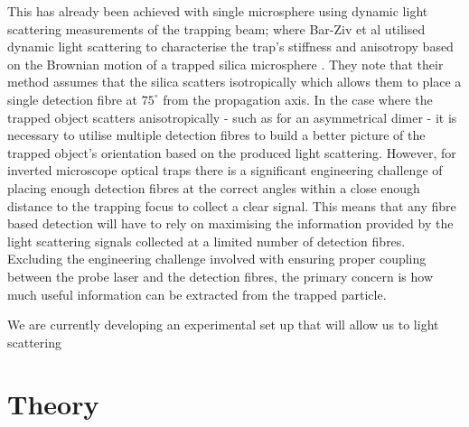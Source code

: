 \documentclass[11pt]{article}
\begin{document}
This has already been achieved with single microsphere using dynamic light scattering measurements of the trapping beam; where Bar-Ziv et al utilised dynamic light scattering to characterise the trap's stiffness and anisotropy based on the Brownian motion of a trapped silica microsphere \cite{1}. They note that their method assumes that the silica scatters isotropically which allows them to place a single detection fibre at $75^\circ$ from the propagation axis. In the case where the trapped object scatters anisotropically - such as for an asymmetrical dimer - it is necessary to utilise multiple detection fibres to build a better picture of the trapped object's orientation based on the produced light scattering. However, for inverted microscope optical traps there is a significant engineering challenge of placing enough detection fibres at the correct angles within a close enough distance to the trapping focus to collect a clear signal. This means that any fibre based detection will have to rely on maximising the information provided by the light scattering signals collected at a limited number of detection fibres. Excluding the engineering challenge involved with ensuring proper coupling between the probe laser and the detection fibres, the primary concern is how much useful information can be extracted from the trapped particle. 

We are currently developing an experimental set up that will allow us to light scattering 

\section*{Theory}
\end{document}
